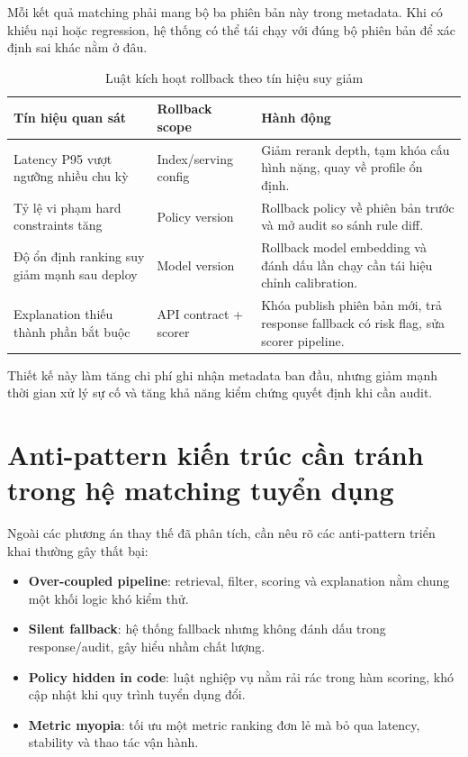 Mỗi kết quả matching phải mang bộ ba phiên bản này trong metadata. Khi có khiếu nại hoặc regression, hệ thống có thể tái chạy với đúng bộ phiên bản để xác định sai khác nằm ở đâu.

\begin{table}[H]
\caption{Luật kích hoạt rollback theo tín hiệu suy giảm}
\centering
\begin{tabularx}{\textwidth}{p{}p{}X}
\toprule
\textbf{Tín hiệu quan sát} & \textbf{Rollback scope} & \textbf{Hành động}\\
\midrule
Latency P95 vượt ngưỡng nhiều chu kỳ & Index/serving config & Giảm rerank depth, tạm khóa cấu hình nặng, quay về profile ổn định.\\
Tỷ lệ vi phạm hard constraints tăng & Policy version & Rollback policy về phiên bản trước và mở audit so sánh rule diff.\\
Độ ổn định ranking suy giảm mạnh sau deploy & Model version & Rollback model embedding và đánh dấu lần chạy cần tái hiệu chỉnh calibration.\\
Explanation thiếu thành phần bắt buộc & API contract + scorer & Khóa publish phiên bản mới, trả response fallback có risk flag, sửa scorer pipeline.\\
\bottomrule
\end{tabularx}
\end{table}

Thiết kế này làm tăng chi phí ghi nhận metadata ban đầu, nhưng giảm mạnh thời gian xử lý sự cố và tăng khả năng kiểm chứng quyết định khi cần audit.

\section{Anti-pattern kiến trúc cần tránh trong hệ matching tuyển dụng}

Ngoài các phương án thay thế đã phân tích, cần nêu rõ các anti-pattern triển khai thường gây thất bại:

\begin{itemize}
  \item \textbf{Over-coupled pipeline}: retrieval, filter, scoring và explanation nằm chung một khối logic khó kiểm thử.
  \item \textbf{Silent fallback}: hệ thống fallback nhưng không đánh dấu trong response/audit, gây hiểu nhầm chất lượng.
  \item \textbf{Policy hidden in code}: luật nghiệp vụ nằm rải rác trong hàm scoring, khó cập nhật khi quy trình tuyển dụng đổi.
  \item \textbf{Metric myopia}: tối ưu một metric ranking đơn lẻ mà bỏ qua latency, stability và thao tác vận hành.
\end{itemize}


